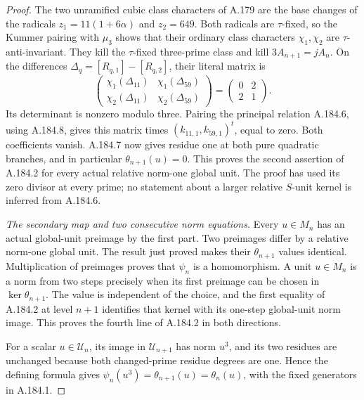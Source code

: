 \begin{proof}
The two unramified cubic class characters of A.179 are the
base changes of the radicals
\(z_1=11(1+6\alpha)\) and \(z_2=649\).
Both radicals are \(\tau\)-fixed, so the Kummer pairing
with \(\mu_3\) shows that their ordinary class characters
\(\chi_1,\chi_2\) are \(\tau\)-anti-invariant.
They kill the \(\tau\)-fixed three-prime class and kill
\(3A_{n+1}=jA_n\).  On the differences
\(\Delta_q=[R_{q,1}]-[R_{q,2}]\), their literal matrix is
\[
 \begin{pmatrix}
 \chi_1(\Delta_{11})&\chi_1(\Delta_{59})\\
 \chi_2(\Delta_{11})&\chi_2(\Delta_{59})
 \end{pmatrix}
                  =\begin{pmatrix}0&2\\2&1\end{pmatrix}.
\tag{A.184.9}
\]
Its determinant is nonzero modulo three.  Pairing the
principal relation A.184.6, using A.184.8, gives this
matrix times \((k_{11,1},k_{59,1})^t\), equal to zero.
Both coefficients vanish.  A.184.7 now gives residue one
at both pure quadratic branches, and in particular
\(\theta_{n+1}(u)=0\).  This proves the second assertion
of A.184.2 for every actual relative norm-one global unit.
The proof has used its zero divisor at every prime; no
statement about a larger relative \(S\)-unit kernel is
inferred from A.184.6.

\emph{The secondary map and two consecutive norm equations.}
Every \(u\in M_n\) has an actual global-unit preimage by
the first part.  Two preimages differ by a relative
norm-one global unit.  The result just proved makes their
\(\theta_{n+1}\) values identical.  Multiplication of
preimages proves that \(\psi_n\) is a homomorphism.
A unit \(u\in M_n\) is a norm from two steps precisely
when its first preimage can be chosen in
\(\ker\theta_{n+1}\).  The value is independent of the
choice, and the first equality of A.184.2 at level \(n+1\)
identifies that kernel with its one-step global-unit norm
image.  This proves the fourth line of A.184.2 in both
directions.

For a scalar \(u\in\mathcal U_n\), its image in
\(\mathcal U_{n+1}\) has norm \(u^3\), and its two
residues are unchanged because both changed-prime residue
degrees are one.  Hence the defining formula gives
\(\psi_n(u^3)=\theta_{n+1}(u)=\theta_n(u)\), with the
fixed generators in A.184.1.


\end{proof}
